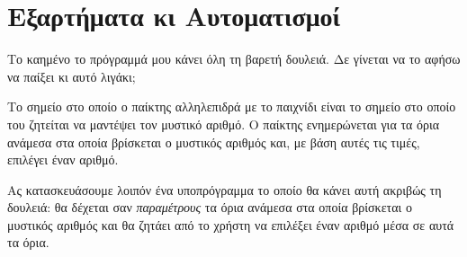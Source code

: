 \documentclass[a4paper,11pt,oneside]{book}
\begin{document}


\section{Εξαρτήματα κι Αυτοματισμοί}

\begin{question}
Το καημένο το πρόγραμμά μου κάνει όλη τη βαρετή δουλειά. Δε γίνεται να το αφήσω να παίξει κι αυτό λιγάκι; 
\end{question}

Το σημείο στο οποίο ο παίκτης αλληλεπιδρά με το παιχνίδι είναι το σημείο στο οποίο του ζητείται να μαντέψει τον μυστικό αριθμό. Ο παίκτης ενημερώνεται για τα όρια ανάμεσα στα οποία βρίσκεται ο μυστικός αριθμός και, με βάση αυτές τις τιμές, επιλέγει έναν αριθμό. 


Ας κατασκευάσουμε λοιπόν ένα υποπρόγραμμα το οποίο θα κάνει αυτή ακριβώς τη δουλειά: θα δέχεται σαν \emph{παραμέτρους} τα όρια ανάμεσα στα οποία βρίσκεται ο μυστικός αριθμός και θα ζητάει από το χρήστη να επιλέξει έναν αριθμό μέσα σε αυτά τα όρια.

%
\end{document}
